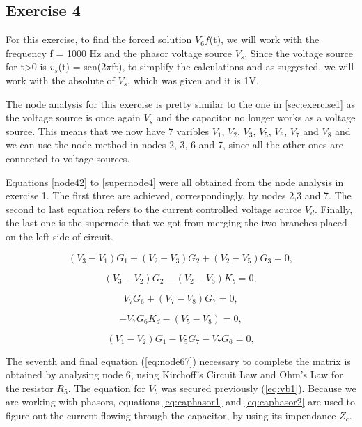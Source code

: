 \subsection{Exercise 4}
\label{sec:exercise4}


For this exercise, to find the forced solution $V_6f$(t), we will work with the frequency f = 1000 Hz and the phasor voltage source $V_s$. Since the voltage source for t>0 is $v_s$(t) = sen(2$\pi$ft), to simplify the calculations and as suggested, we will work with the absolute of $V_s$, which was given and it is 1V. 

The node analysis for this exercise is pretty similar to the one in \ref{sec:exercise1} as the voltage source is once again $V_s$ and the capacitor no longer works as a voltage source. This means that we now have 7 varibles $V_1$, $V_2$, $V_3$, $V_5$, $V_6$, $V_7$ and $V_8$ and we can use the node method in nodes 2, 3, 6 and 7, since all the other ones are connected to voltage sources.

Equations \ref{node42} to \ref{supernode4} were all obtained from the node analysis in exercise 1. The first three are achieved, correspondingly, by nodes 2,3 and 7. The second to last equation refers to the current controlled voltage source $V_d$. Finally, the last one is the supernode that we got from merging the two branches placed on the left side of circuit.

\begin{equation}
  (V_{3} - V_{1})G_{1} + (V_{2} - V_{3})G_{2} + (V_{2} - V_{5})G_{3}= 0,
  \label{eq:node42}
\end{equation}

\begin{equation}
  (V_{3} - V_{2})G_{2} - (V_{2} - V_{5})K_{b} = 0,
  \label{eq:node43}
\end{equation}


\begin{equation}
  V_{7}G_{6} + (V_{7} - V_{8})G_{7} = 0,
  \label{eq:node47}
\end{equation}


\begin{equation}
  -V_{7}G_{6}K_{d} - (V_{5} - V_{8}) = 0,
  \label{eq:vd4}
\end{equation}

\begin{equation}
  (V_{1} - V_{2})G_{1} - V_{5}G_{7} - V_{7}G_{6} = 0,
  \label{eq:supernode4}
\end{equation}

The seventh and final equation (\ref{eq:node67}) necessary to complete the matrix is obtained by analysing node 6, using Kirchoff's Circuit Law and Ohm's Law for the resistor $R_5$. The equation for $V_b$ was secured previously (\ref{eq:vb1}). Because we are working with phasors, equations \ref{eq:caphasor1} and \ref{eq:caphasor2} are used to figure out the current flowing through the capacitor, by using its impendance $Z_c$.


